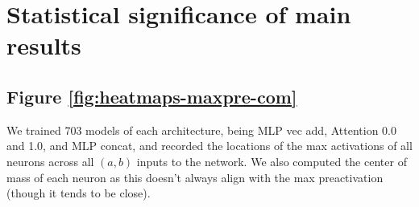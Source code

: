 \documentclass{article} %
\theoremstyle{plain}
\theoremstyle{definition}
\newtheorem{empirical fact}[theorem]{Empirical Fact}
\begin{document}
\section{Statistical significance of main results}

\subsection{Figure \ref{fig:heatmaps-maxpre-com}}

We trained 703 models of each architecture, being MLP vec add, Attention 0.0 and 1.0, and MLP concat, and recorded the locations of the max activations of all neurons across all $(a,b)$ inputs to the network. We also computed the center of mass of each neuron as this doesn't always align with the max preactivation (though it tends to be close). 
\end{document}
